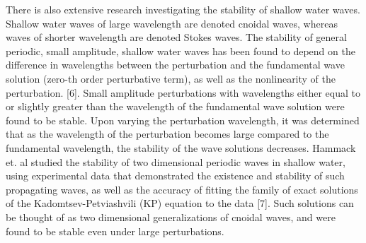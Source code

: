 \documentclass{article}
\begin{document}
There is also extensive research investigating the stability of shallow water waves. Shallow water waves of large wavelength are denoted cnoidal waves, whereas waves of shorter wavelength are denoted Stokes waves. The stability of general periodic, small amplitude, shallow water waves has been found to depend on the difference in wavelengths between the perturbation and the fundamental wave solution (zero-th order perturbative term), as well as the nonlinearity of the perturbation. [6]. Small amplitude perturbations with wavelengths either equal to or slightly greater than the wavelength of the fundamental wave solution were found to be stable. Upon varying the perturbation wavelength, it was determined that as the wavelength of the perturbation becomes large compared to the fundamental wavelength, the stability of the wave solutions decreases. Hammack et. al studied the stability of two dimensional periodic waves in shallow water, using experimental data that demonstrated the existence and stability of such propagating waves, as well as the accuracy of fitting the family of exact solutions of the Kadomtsev-Petviashvili (KP) equation to the data [7]. Such solutions can be thought of as two dimensional generalizations of cnoidal waves, and were found to be stable even under large perturbations. 
\\
\end{document}
